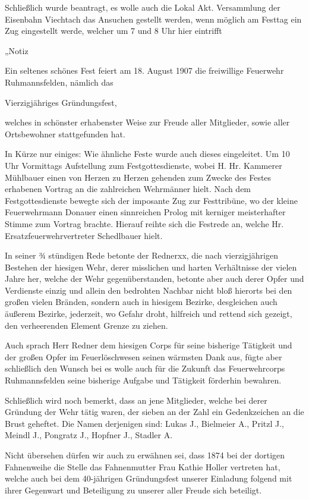 \documentclass[12pt,a4paper]{book}
\begin{document}
Schließlich wurde beantragt, es wolle auch die Lokal Akt. Versammlung der
Eisenbahn Viechtach das Ansuchen gestellt werden, wenn möglich am Festtag ein
Zug eingestellt werde, welcher um 7 und 8 Uhr hier eintrifft

„Notiz

Ein seltenes schönes Fest feiert am 18. August 1907 die freiwillige Feuerwehr
Ruhmannsfelden, nämlich das

Vierzigjähriges Gründungsfest,

welches in schönster erhabenster Weise zur Freude aller Mitglieder, sowie aller
Ortsbewohner stattgefunden hat.

In Kürze nur einiges: Wie ähnliche Feste wurde auch dieses eingeleitet. Um 10
Uhr Vormittags Aufstellung zum Festgottesdienste, wobei H. Hr. Kammerer
Mühlbauer einen von Herzen zu Herzen gehenden zum Zwecke des Festes erhabenen
Vortrag an die zahlreichen Wehrmänner hielt. Nach dem Festgottesdienste bewegte
sich der imposante Zug zur Festtribüne, wo der kleine Feuerwehrmann Donauer
einen sinnreichen Prolog mit kerniger meisterhafter Stimme zum Vortrag brachte.
Hierauf reihte sich die Festrede an, welche Hr. Ersatzfeuerwehrvertreter
Schedlbauer hielt.

In seiner ¾ stündigen Rede betonte der Rednerxx, die nach vierzigjährigen
Bestehen der hiesigen Wehr, derer misslichen und harten Verhältnisse der vielen
Jahre her, welche der Wehr gegenüberstanden, betonte aber auch derer Opfer und
Verdienste einzig und allein den bedrohten Nachbar nicht bloß hierorts bei den
großen vielen Bränden, sondern auch in hiesigem Bezirke, desgleichen auch
äußerem Bezirke, jederzeit, wo Gefahr droht, hilfreich und rettend sich gezeigt,
den verheerenden Element Grenze zu ziehen.

Auch sprach Herr Redner dem hiesigen Corps für seine bisherige Tätigkeit und der
großen Opfer im Feuerlöschwesen seinen wärmsten Dank aus, fügte aber schließlich
den Wunsch bei es wolle auch für die Zukunft das Feuerwehrcorps Ruhmannsfelden
seine bisherige Aufgabe und Tätigkeit förderhin bewahren.

Schließlich wird noch bemerkt, dass an jene Mitglieder, welche bei derer
Gründung der Wehr tätig waren, der sieben an der Zahl ein Gedenkzeichen an die
Brust geheftet. Die Namen derjenigen sind: Lukas J., Bielmeier A., Pritzl J.,
Meindl J., Pongratz J., Hopfner J., Stadler A.

Nicht übersehen dürfen wir auch zu erwähnen sei, dass 1874 bei der dortigen
Fahnenweihe die Stelle das Fahnenmutter Frau Kathie Holler vertreten hat, welche
auch bei dem 40-jährigen Gründungsfest unserer Einladung folgend mit ihrer
Gegenwart und Beteiligung zu unserer aller Freude sich beteiligt.
\end{document}
